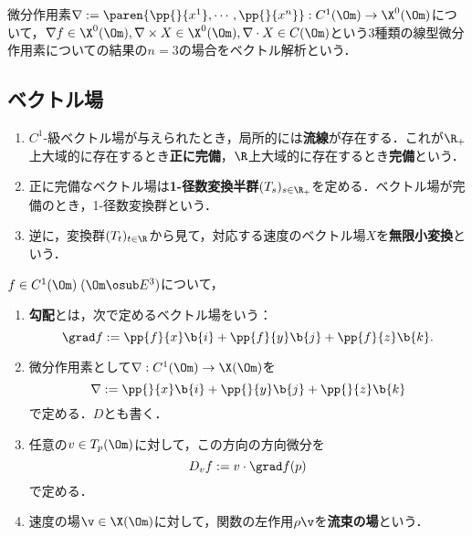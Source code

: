 \documentclass[uplatex,dvipdfmx]{jsreport}
\begin{document}
\begin{tcolorbox}[colframe=ForestGreen, colback=ForestGreen!10!white,breakable,colbacktitle=ForestGreen!40!white,coltitle=black,fonttitle=\bfseries\sffamily,
title=]
    微分作用素$\nabla:=\paren{\pp{}{x^1},\cdots,\pp{}{x^n}}:C^1(\Om)\to\X^0(\Om)$について，$\nabla f\in\X^0(\Om),\nabla\times X\in\X^0(\Om),\nabla\cdot X\in C(\Om)$という3種類の線型微分作用素についての結果の$n=3$の場合をベクトル解析という．
\end{tcolorbox}

\subsection{ベクトル場}

\begin{definition}\mbox{}
    \begin{enumerate}
        \item $C^1$-級ベクトル場が与えられたとき，局所的には\textbf{流線}が存在する．これが$\R_+$上大域的に存在するとき\textbf{正に完備}，$\R$上大域的に存在するとき\textbf{完備}という．
        \item 正に完備なベクトル場は\textbf{1-径数変換半群}$(T_s)_{s\in\R_+}$を定める．ベクトル場が完備のとき，1-径数変換群という．
        \item 逆に，変換群$(T_t)_{t\in\R}$から見て，対応する速度のベクトル場$X$を\textbf{無限小変換}という．
    \end{enumerate}
\end{definition}

\begin{definition}
    $f\in C^1(\Om)\;(\Om\osub E^3)$について，
    \begin{enumerate}
        \item \textbf{勾配}とは，次で定めるベクトル場をいう：
        \[\grad f:=\pp{f}{x}\b{i}+\pp{f}{y}\b{j}+\pp{f}{z}\b{k}.\]
        \item 微分作用素として$\nabla:C^1(\Om)\to\X(\Om)$を
        \[\nabla:=\pp{}{x}\b{i}+\pp{}{y}\b{j}+\pp{}{z}\b{k}\]
        で定める．$D$とも書く．
        \item 任意の$v\in T_p(\Om)$に対して，この方向の方向微分を
        \[D_vf:=v\cdot\grad f(p)\]
        で定める．
        \item 速度の場$\v\in\X(\Om)$に対して，関数の左作用$\rho\v$を\textbf{流束の場}という．
    \end{enumerate}
\end{definition}
\end{document}
